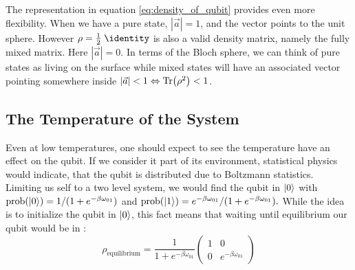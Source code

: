 The representation in equation \ref{eq:density_of_qubit} provides even more flexibility. When we have a pure state, $|\Vec{a}| = 1$, and the vector points to the unit sphere. However $\rho = \frac12 \; \identity$ is also a valid density matrix, namely the fully mixed matrix. Here $|\Vec{a}|=0$. In terms of the Bloch sphere, we can think of pure states as living on the surface while mixed states will have an associated vector pointing somewhere inside $|\Vec{a}|<1\Leftrightarrow \Tr(\rho^2) < 1$.

\subsection{The Temperature of the System}
Even at low temperatures, one should expect to see the temperature have an effect on the qubit. If we consider it part of its environment, statistical physics would indicate, that the qubit is distributed due to Boltzmann statistics. Limiting us self to a two level system, we would find the qubit in $\ket{0}$ with $\text{prob}(\ket{0}) = 1 / (1 + e^{-\beta\omega_{01}})$ and $\text{prob}(\ket{1}) = e^{-\beta\omega_{01}} / (1 + e^{-\beta\omega_{01}}).$ While the idea is to initialize the qubit in $\ket{0}$, this fact means that waiting until equilibrium our qubit would be in \cite{statphys?}:
\begin{equation}\label{eq:equilibrium_qubit_density_matrix}
    \rho_{\text{equilibrium}} = \frac{1}{1 + e^{-\beta\omega_{01}}}\begin{pmatrix}
        1 & 0 \\
        0 & e^{-\beta\omega_{01}}
    \end{pmatrix}
\end{equation}

